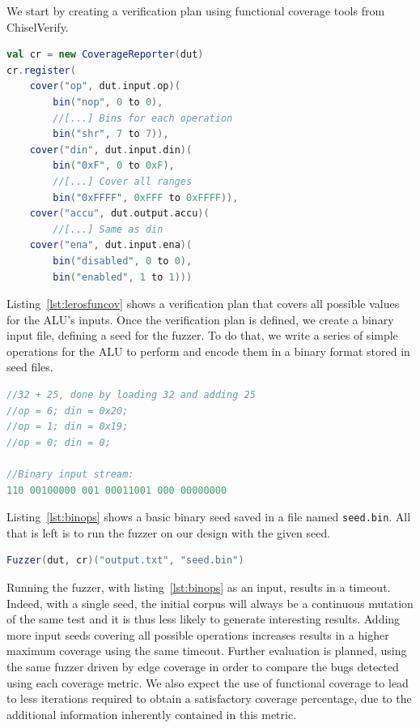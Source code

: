 \documentclass[conference]{IEEEtran}
\newcommand{\todo}[1]{{\color{olive} TODO: #1}}
\begin{document}
We start by creating a verification plan using functional coverage tools from ChiselVerify.
\begin{lstlisting}[captionpos=b,caption={Simple verification plan for the Leros ALU. Since this is still a work-in-progress, the verification plan is simple and only contains basic cover points. The functional coverage code is also abridged since it is not our main focus in this paper.},label={lst:lerosfuncov},language=scala]
val cr = new CoverageReporter(dut)
cr.register(
    cover("op", dut.input.op)(
        bin("nop", 0 to 0),
        //[...] Bins for each operation
        bin("shr", 7 to 7)),
    cover("din", dut.input.din)(
        bin("0xF", 0 to 0xF),
        //[...] Cover all ranges
        bin("0xFFFF", 0xFFF to 0xFFFF)),
    cover("accu", dut.output.accu)(
        //[...] Same as din
    cover("ena", dut.input.ena)(
        bin("disabled", 0 to 0),
        bin("enabled", 1 to 1)))
\end{lstlisting}
Listing~\ref{lst:lerosfuncov} shows a verification plan that covers all possible values for the ALU's inputs.
Once the verification plan is defined, we create a binary input file, defining a seed for the fuzzer.
To do that, we write a series of simple operations for the ALU to perform and encode them in a binary format stored in seed files.
\begin{lstlisting}[captionpos=b,caption={Basic ALU operations; dut.io.op is 3 bits wide and din is 8 bits wide. For clarity, a whitespace separates each input.},label={lst:binops},language=C]
//32 + 25, done by loading 32 and adding 25 
//op = 6; din = 0x20; 
//op = 1; din = 0x19;
//op = 0; din = 0;

//Binary input stream:
110 00100000 001 00011001 000 00000000
\end{lstlisting}
Listing~\ref{lst:binops} shows a basic binary seed saved in a file named \texttt{seed.bin}.
All that is left is to run the fuzzer on our design with the given seed.
\begin{lstlisting}[captionpos=b,caption={Call to the fuzzer using the setup previously described.},label={lst:fuzzcall},language=scala]
Fuzzer(dut, cr)("output.txt", "seed.bin")
\end{lstlisting}

Running the fuzzer, with listing~\ref{lst:binops} as an input, results in a timeout.
Indeed, with a single seed, the initial corpus will always be a continuous mutation of the same test and it is thus less likely to generate interesting results.
Adding more input seeds covering all possible operations increases results in a higher maximum coverage using the same timeout.
Further evaluation is planned, using the same fuzzer driven by edge coverage in order to compare the bugs detected using each coverage metric.
We also expect the use of functional coverage to lead to less iterations required to obtain a satisfactory coverage percentage, due to the additional information inherently contained in this metric. 
\end{document}
